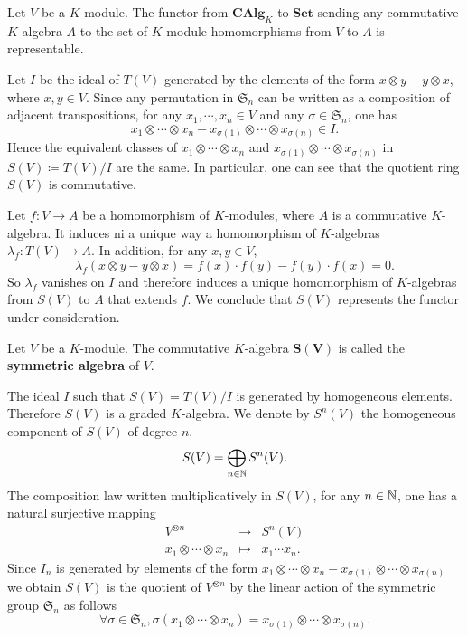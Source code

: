 \begin{theoremenv}
    Let $V$ be a $K$-module.
    The functor from $\mathbf{CAlg}_{K}$ to $\mathbf{Set}$ sending any commutative $K$-algebra $A$ to the set of $K$-module homomorphisms from $V$ to $A$ is representable.
\end{theoremenv}
\begin{proofenv}
    Let $I$ be the ideal of $T(V)$ generated by the elements of the form $x\otimes y - y\otimes x$, where $x,y \in V$.
    Since any permutation in $\mathfrak{S}_{n}$ can be written as a composition of adjacent transpositions, for any $x_1, \cdots, x_n \in V$ and any $\sigma \in \mathfrak{S}_n$, one has
    $$ x_1 \otimes \cdots \otimes x_n - x_{\sigma(1)} \otimes \cdots \otimes x_{\sigma(n)} \in I.$$
    Hence the equivalent classes of $x_1\otimes \cdots \otimes x_n$ and $x_{\sigma(1)} \otimes \cdots \otimes x_{\sigma(n)}$ in $S(V) \coloneq T(V)/I$ are the same.
    In particular, one can see that the quotient ring $S(V)$ is commutative.
    
    \quad Let $f: V \rightarrow A$ be a homomorphism of $K$-modules, where $A$ is a commutative $K$-algebra.
    It induces ni a unique way a homomorphism of $K$-algebras $\lambda_f : T(V) \rightarrow A$.
    In addition, for any $x,y \in V$,
    $$ \lambda_f(x\otimes y - y\otimes x) = f(x) \cdot f(y) - f(y) \cdot f(x) = 0.$$
    So $\lambda_f$ vanishes on $I$ and therefore induces a unique homomorphism of $K$-algebras from $S(V)$ to $A$ that extends $f$.
    We conclude that $S(V)$ represents the functor under consideration.
\end{proofenv}

\begin{definitionenv}
    Let $V$ be a $K$-module.
    The commutative $K$-algebra $\bm{S(V)}$ is called the \textbf{symmetric algebra} of $V$.
\end{definitionenv}

\begin{remark}
    The ideal $I$ such that $S(V) = T(V)/I$ is generated by homogeneous elements.
    Therefore $S(V)$ is a graded $K$-algebra.
    We denote by $S^n(V)$ the homogeneous component of $S(V)$ of degree $n$.
    $$ S(V) = \bigoplus_{n\in \mathbb{N}} S^n(V).$$
    The composition law written multiplicatively in $S(V)$, for any $n\in \mathbb{N}$, one has a natural surjective mapping
    $$ \begin{array}{rcl}
        V^{\otimes n} & \rightarrow & S^n(V)\\
        x_1 \otimes \cdots \otimes x_n & \mapsto & x_1 \cdots x_n.
    \end{array}$$
    Since $I_n$ is generated by elements of the form $x_1 \otimes \cdots \otimes x_n - x_{\sigma(1)} \otimes \cdots \otimes x_{\sigma(n)}$ 
    we obtain $S(V)$ is the quotient of $V^{\otimes n}$ by the linear action of the symmetric group $\mathfrak{S}_n$ as follows
    $$ \forall \sigma \in \mathfrak{S}_n, \sigma (x_1 \otimes \cdots \otimes x_n) = x_{\sigma(1)} \otimes \cdots \otimes x_{\sigma(n)}.$$
\end{remark}

